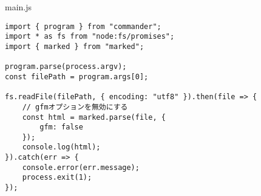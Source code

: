 \begin{listtitle}
main.js
\end{listtitle}
\begin{lstlisting}
import { program } from "commander";
import * as fs from "node:fs/promises";
import { marked } from "marked";

program.parse(process.argv);
const filePath = program.args[0];

fs.readFile(filePath, { encoding: "utf8" }).then(file => {
    // gfmオプションを無効にする
    const html = marked.parse(file, {
        gfm: false
    });
    console.log(html);
}).catch(err => {
    console.error(err.message);
    process.exit(1);
});
\end{lstlisting}
\listend
